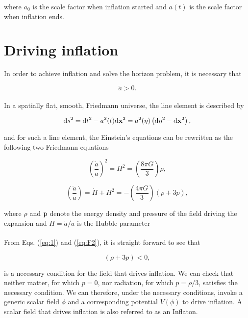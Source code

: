 \documentclass[12pt,a4paper,oneside]{book}
\begin{document}
\noindent where $a_0$ is the scale factor when inflation started and $a(t)$ is the scale factor when inflation ends.

\section{Driving inflation}

In order to achieve inflation and solve the horizon problem, it is necessary that

\begin{equation}\label{eq:1}
\ddot{a} > 0.
\end{equation}

\paragraph*{} In a spatially flat, smooth, Friedmann universe, the line element is described by

\begin{equation}
{\rm d}s^2 = {\rm d}t^2 - a^2(t){\rm d}{\bf x}^2 = a^2(\eta)\left({\rm d}\eta^2 - {\rm d}{\bf x}^2\right),
\end{equation}

\noindent and for such a line element, the Einstein's equations can be rewritten as the following two Friedmann equations

\begin{equation}\label{eq:F1}
\left(\frac{\dot{a}}{a}\right)^2 = H^2 = \left(\frac{8\pi G}{3}\right)\rho,
\end{equation}

\begin{equation}\label{eq:F2}
\left(\frac{\ddot{a}}{a}\right) = \dot{H} + H^2= -\left(\frac{4\pi G}{3}\right)(\rho + 3p),
\end{equation}

\noindent where $\rho$ and ${\rm p}$ denote the energy density and pressure of the field driving the expansion 
and $H = \dot{a}/a$ is the Hubble parameter

\paragraph*{} From Eqs. (\ref{eq:1}) and (\ref{eq:F2}), it is straight forward to see that

\begin{equation}
(\rho + 3p) < 0,
\end{equation}

\noindent is a necessary condition for the field that drives inflation. We can check that neither matter, for which $p = 0$, 
nor radiation, for which $p = \rho/3$, satisfies the necessary condition. We can therefore, under the necessary conditions, invoke 
a generic scalar field $\phi$ and a corresponding potential $V(\phi)$ to drive inflation. A scalar field that drives inflation 
is also referred to as an Inflaton.
\end{document}

